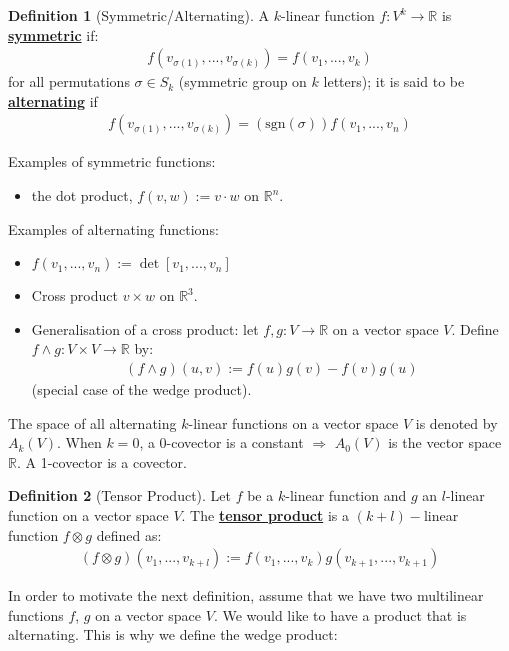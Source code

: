 \documentclass[11pt]{scrartcl}
\newcommand{\R}[0]{\mathbb{R}}
\theoremstyle{definition}
\newtheorem{definition}{Definition}
\theoremstyle{remark}
\newcommand{\dfn}[1]{\textbf{\underline{#1}}}
\begin{document}
{\begin{definition}[Symmetric/Alternating]
	A $k$-linear function $f: V^k \rightarrow \R$ is \dfn{symmetric} if: 
	\begin{align*}
		f(v_{\sigma(1)}, ..., v_{\sigma(k)}) = f(v_1, ..., v_k)
	\end{align*}
	for all permutations $\sigma \in S_k$ (symmetric group on $k$ letters); it is said to be \dfn{alternating} if
	\begin{align*}
		f(v_{\sigma(1)}, ..., v_{\sigma(k)} ) = (\text{sgn}(\sigma)) f(v_1, ..., v_n) 
	\end{align*}
\end{definition}
Examples of symmetric functions: 
\begin{itemize}[noitemsep]
	\item the dot product, $f(v,w) := v \cdot w$ on $\R^n$. 
\end{itemize}
Examples of alternating functions: 
\begin{itemize}[noitemsep]
	\item $f(v_1, ..., v_n) := \det [v_1, ..., v_n]$
	\item Cross product $v \times w$ on $\R^3$. 
	\item Generalisation of a cross product: let $f, g: V \rightarrow \R$ on a vector space $V$. Define $f \wedge g: V \times V \rightarrow \R$ by: 
	\begin{align*}
		( f \wedge g ) (u,v) := f(u) g(v) - f(v) g(u) 
	\end{align*}
	(special case of the wedge product). 
\end{itemize}
The space of all alternating $k$-linear functions on a vector space $V$ is denoted by $A_k(V)$. When $k=0$, a $0$-covector is a constant $\Rightarrow$ $A_0(V)$ is the vector space $\R$. A 1-covector is a covector. 

\begin{definition}[Tensor Product]
	Let $f$ be a $k$-linear function and $g$ an $l$-linear function on a vector space $V$. The \dfn{tensor product} is a $(k+l)-$linear function $f \otimes g$ defined as: 
	\begin{align}
		(f \otimes g)(v_1, ..., v_{k+l}) := f(v_1, ..., v_k) g(v_{k+1}, ..., v_{k+1}) 	
	\end{align}

\end{definition}

In order to motivate the next definition, assume that we have two multilinear functions $f$, $g$ on a vector space $V$. We would like to have a product that is alternating. This is why we define the wedge product: 

}
\end{document}

